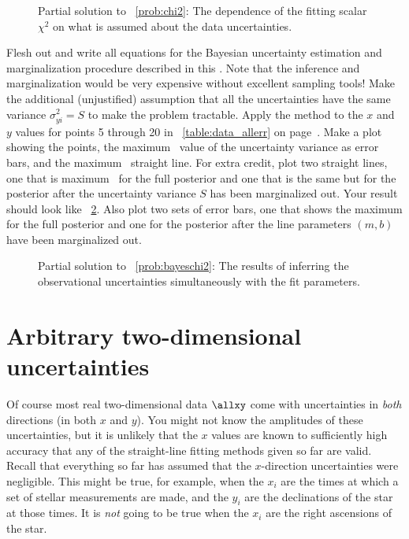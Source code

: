 \documentclass[12pt,twoside,pdftex]{article}
\begin{document}
\begin{figure}[htbp]
\caption{Partial solution to \problemname~\ref{prob:chi2}: The
dependence of the fitting scalar $\chi^2$ on what is assumed about the
data uncertainties.}\label{fig:chi2}
\end{figure}

\begin{problem}\label{prob:bayeschi2}
Flesh out and write all equations for the Bayesian uncertainty
estimation and marginalization procedure described in this
\sectionname.  Note that the inference and marginalization would be
very expensive without excellent sampling tools!  Make the additional
(unjustified) assumption that all the uncertainties have the same
variance $\sigma_{yi}^2=S$ to make the problem tractable.  Apply the
method to the $x$ and $y$ values for points 5 through 20 in
\tablename~\ref{table:data_allerr} on
page~\pageref{table:data_allerr}.  Make a plot showing the points, the
maximum \aposteriori\ value of the uncertainty variance as error bars,
and the maximum \aposteriori\ straight line.  For extra credit, plot
two straight lines, one that is maximum \aposteriori\ for the full
posterior and one that is the same but for the posterior after the
uncertainty variance $S$ has been marginalized out.  Your result
should look like \figurename~\ref{fig:bayeschi2}.  Also plot two
sets of error bars, one that shows the maximum for the full posterior
and one for the posterior after the line parameters $(m,b)$ have been
marginalized out.
\end{problem}

\begin{figure}[htbp]
\caption{Partial solution to \problemname~\ref{prob:bayeschi2}: The
results of inferring the observational uncertainties simultaneously
with the fit parameters.}\label{fig:bayeschi2}
\end{figure}

\section{Arbitrary two-dimensional uncertainties}\label{sec:twod}

Of course most real two-dimensional data $\allxy$ come with
uncertainties in \emph{both} directions (in both $x$ and $y$).  You
might not know the amplitudes of these uncertainties, but it is
unlikely that the $x$ values are known to sufficiently high accuracy
that any of the straight-line fitting methods given so far are valid.
Recall that everything so far has assumed that the $x$-direction
uncertainties were negligible.  This might be true, for example, when
the $x_i$ are the times at which a set of stellar measurements are
made, and the $y_i$ are the declinations of the star at those times.
It is \emph{not} going to be true when the $x_i$ are the right
ascensions of the star.
\end{document}

